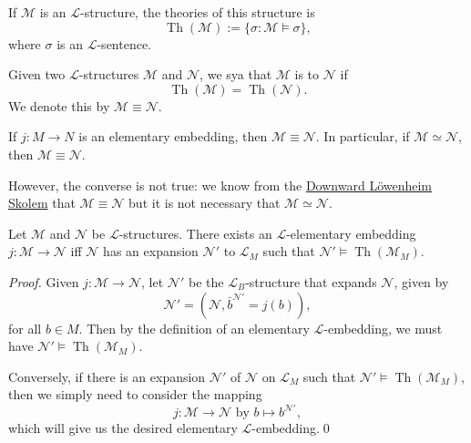 \documentclass[notoc,notitlepage]{tufte-book}
\DeclareMathOperator{\Th}{Th }
\begin{document}
\begin{defn}\label{defn:theories_of_a_structure}
  If $\mathcal{M}$ is an $\mathcal{L}$-structure, the theories of this structure is
  \begin{equation*}
    \Th(\mathcal{M}) := \{ \sigma : \mathcal{M} \models \sigma \},
  \end{equation*}
  where $\sigma$ is an $\mathcal{L}$-sentence.
\end{defn}

\begin{defn}\label{defn:_l_elementarily_equivalent}
  Given two $\mathcal{L}$-structures $\mathcal{M}$ and $\mathcal{N}$, we sya that $\mathcal{M}$ is  to $\mathcal{N}$ if
  \begin{equation*}
    \Th(\mathcal{M}) = \Th(\mathcal{N}).
  \end{equation*}
  We denote this by $\mathcal{M} \equiv \mathcal{N}$.
\end{defn}

\begin{note}
  If $j : M \to N$ is an elementary embedding, then $\mathcal{M} \equiv \mathcal{N}$. In particular, if $\mathcal{M} \simeq \mathcal{N}$, then $\mathcal{M} \equiv \mathcal{N}$.

  However, the converse is not true: we know from the \hyperref[thm:downward_lowenheim_skolem]{Downward L\"{o}wenheim Skolem} that $\mathcal{M} \equiv \mathcal{N}$ but it is not necessary that $\mathcal{M} \simeq \mathcal{N}$.
\end{note}

\begin{propo}\label{propo:elementary_embeddings_iff_expansion_over_parameterized_language}
  Let $\mathcal{M}$ and $\mathcal{N}$ be $\mathcal{L}$-structures. There exists an $\mathcal{L}$-elementary embedding $j : \mathcal{M} \to \mathcal{N}$ iff $\mathcal{N}$ has an expansion $\mathcal{N}'$ to $\mathcal{L}_M$ such that $\mathcal{N}' \models \Th(\mathcal{M}_M)$.
\end{propo}

\begin{proof}
  Given $j : \mathcal{M} \to \mathcal{N}$, let $\mathcal{N}'$ be the $\mathcal{L}_B$-structure that expands $\mathcal{N}$, given by
  \begin{equation*}
    \mathcal{N}' = (\mathcal{N}, \bar{b}^{\mathcal{N}'} = j(b)),
  \end{equation*}
  for all $b \in M$. Then by the definition of an elementary $\mathcal{L}$-embedding, we must have $\mathcal{N}' \models \Th(\mathcal{M}_M)$.

  Conversely, if there is an expansion $\mathcal{N}'$ of $\mathcal{N}$ on $\mathcal{L}_M$ such that $\mathcal{N}' \models \Th(\mathcal{M}_M)$, then we simply need to consider the mapping
  \begin{equation*}
    j : \mathcal{M} \to \mathcal{N} \text{ by } b \mapsto b^{\mathcal{N}'},
  \end{equation*}
  which will give us the desired elementary $\mathcal{L}$-embedding.\qed\
\end{proof}
\end{document}
